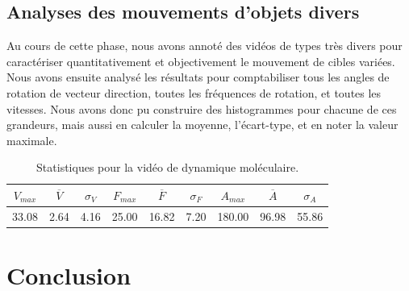 	\subsection{Analyses des mouvements d'objets divers}
	Au cours de cette phase, nous avons annoté des vidéos de types très divers pour caractériser quantitativement et objectivement le mouvement de cibles variées. Nous avons ensuite analysé les résultats pour comptabiliser tous les angles de rotation de vecteur direction, toutes les fréquences de rotation, et toutes les vitesses. Nous avons donc pu construire des histogrammes pour chacune de ces grandeurs, mais aussi en calculer la moyenne, l'écart-type, et en noter la valeur maximale.
	
\begin{table}
	\centering
	\begin{tabular}{c c c c c c c c c}
		$V_{max}$	& $\overline{V}$	& $\sigma_{V}$	& $F_{max}$	& $\overline{F}$	& $\sigma_{F}$	& $A_{max}$	& $\overline{A}$	& $\sigma_{A}$	\bigstrut[b] \\ \hline

		33.08		& 2.64				& 4.16			& 25.00		& 16.82				& 7.20			& 180.00	& 96.98				& 55.86			\bigstrut[t] \\
	\end{tabular}
	\caption[Statistiques pour la vidéo de dynamique moléculaire]{Statistiques pour la vidéo de dynamique moléculaire.}
	\label{tab:atom_stats}
\end{table}

\section{Conclusion}

\clearpage
